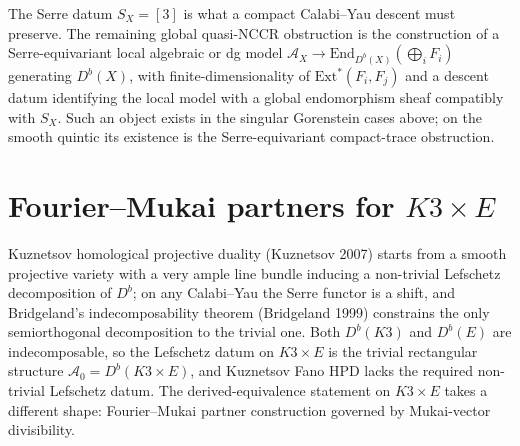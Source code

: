 \documentclass[12pt]{amsart}
\theoremstyle{remark}
\providecommand{\End}{\mathrm{End}}
\begin{document}
The Serre datum \(S_X=[3]\) is what a compact Calabi--Yau descent must
preserve.  The remaining global quasi-NCCR obstruction is the
construction of a Serre-equivariant local algebraic or dg model
\(\mathcal A_X\to\End_{D^b(X)}(\bigoplus_i F_i)\) generating
\(D^b(X)\), with finite-dimensionality of \(\mathrm{Ext}^*(F_i,F_j)\)
and a descent datum identifying the local model with a global
endomorphism sheaf compatibly with \(S_X\).  Such an object exists in
the singular Gorenstein cases above; on the smooth quintic its
existence is the Serre-equivariant compact-trace obstruction.

\section{\texorpdfstring{Fourier--Mukai partners for $K3 \times E$}{Fourier-Mukai partners for K3 x E}}\label{sec:fm-k3e}

Kuznetsov homological projective duality (Kuznetsov 2007) starts from
a smooth projective variety with a very ample line bundle
inducing a non-trivial Lefschetz decomposition of \(D^b\); on any
  Calabi--Yau the Serre functor is a shift, and Bridgeland's
  indecomposability theorem (Bridgeland 1999) constrains the only
  semiorthogonal decomposition to the trivial one.  Both \(D^b(K3)\) and \(D^b(E)\) are
indecomposable, so the Lefschetz datum on \(K3\times E\) is the
trivial rectangular structure \(\mathcal A_0=D^b(K3\times E)\), and
Kuznetsov Fano HPD lacks the required non-trivial Lefschetz datum.  The derived-equivalence statement
on \(K3\times E\) takes a different shape: Fourier--Mukai partner
construction governed by Mukai-vector divisibility.
\end{document}
